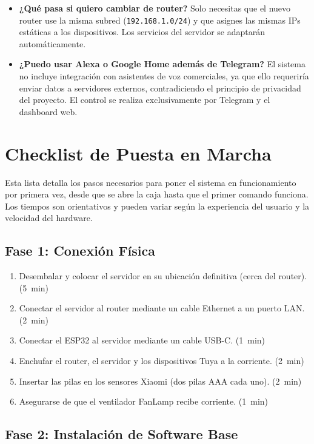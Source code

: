 \begin{itemize}
    \item \textbf{¿Qué pasa si quiero cambiar de router?} Solo necesitas que el nuevo router use la misma subred (\texttt{192.168.1.0/24}) y que asignes las mismas IPs estáticas a los dispositivos. Los servicios del servidor se adaptarán automáticamente.

    \item \textbf{¿Puedo usar Alexa o Google Home además de Telegram?} El sistema no incluye integración con asistentes de voz comerciales, ya que ello requeriría enviar datos a servidores externos, contradiciendo el principio de privacidad del proyecto. El control se realiza exclusivamente por Telegram y el dashboard web.
\end{itemize}

\section{Checklist de Puesta en Marcha}
\label{sec:checklist}

Esta lista detalla los pasos necesarios para poner el sistema en funcionamiento por primera vez, desde que se abre la caja hasta que el primer comando funciona. Los tiempos son orientativos y pueden variar según la experiencia del usuario y la velocidad del hardware.

\subsection{Fase 1: Conexión Física}

\begin{enumerate}
    \item Desembalar y colocar el servidor en su ubicación definitiva (cerca del router). \hfill (5~min)
    \item Conectar el servidor al router mediante un cable Ethernet a un puerto LAN. \hfill (2~min)
    \item Conectar el ESP32 al servidor mediante un cable USB-C. \hfill (1~min)
    \item Enchufar el router, el servidor y los dispositivos Tuya a la corriente. \hfill (2~min)
    \item Insertar las pilas en los sensores Xiaomi (dos pilas AAA cada uno). \hfill (2~min)
    \item Asegurarse de que el ventilador FanLamp recibe corriente. \hfill (1~min)
\end{enumerate}

\subsection{Fase 2: Instalación de Software Base}

